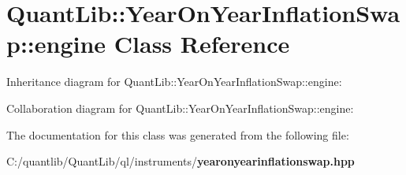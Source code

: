 \section{Quant\+Lib\+:\+:Year\+On\+Year\+Inflation\+Swap\+:\+:engine Class Reference}
\label{class_quant_lib_1_1_year_on_year_inflation_swap_1_1engine}


Inheritance diagram for Quant\+Lib\+:\+:Year\+On\+Year\+Inflation\+Swap\+:\+:engine\+:


Collaboration diagram for Quant\+Lib\+:\+:Year\+On\+Year\+Inflation\+Swap\+:\+:engine\+:


The documentation for this class was generated from the following file\+:\begin{DoxyCompactItemize}
\item 
C\+:/quantlib/\+Quant\+Lib/ql/instruments/{\bf yearonyearinflationswap.\+hpp}\end{DoxyCompactItemize}
